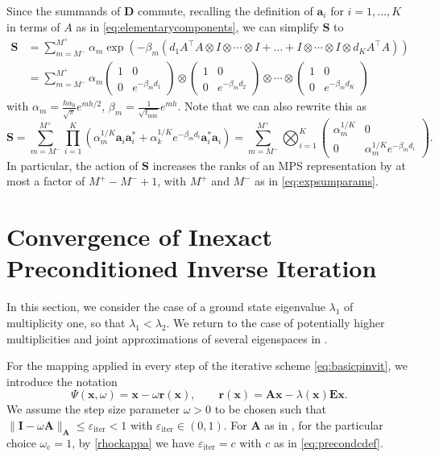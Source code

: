 \documentclass[a4paper,11pt,oneside]{amsart}
\theoremstyle{definition}
\theoremstyle{remark}
\newcommand{\A}{\ten A}
\newcommand{\E}{\ten E}
\newcommand{\ten}[1]{\boldsymbol{#1}}
\newcommand{\eiter}{\ensuremath{\varepsilon_{\mathrm{iter}}}}
\newcommand{\trp}{\top}
\numberwithin{equation}{section}
\numberwithin{theorem}{section}
\begin{document}
Since the summands of ${\ten D}$ commute, recalling the definition of $\ten a_i$ for $i=1,\ldots,K$ in terms of $A$ as in \eqref{eq:elementarycomponents}, we can simplify $\ten S$ to
\begin{align*}
\ten S & =
 \sum_{m = M^-}^{M^+} \alpha_m \exp(-\beta_m (d_{1} A^\trp A \otimes I \otimes \cdots \otimes  I + \ldots +  I \otimes \cdots \otimes  I \otimes d_K A^\trp A))   \\
& =  \sum_{m = M^-}^{M^+} \alpha_m  \begin{pmatrix}
1 & 0 \\ 0 & e^{-\beta_m   d_1}
\end{pmatrix}  \otimes \begin{pmatrix}
1 & 0 \\ 0 & e^{-\beta_m   d_2}
\end{pmatrix}  \otimes \cdots \otimes  \begin{pmatrix}
1 & 0 \\ 0 & e^{-\beta_m   d_K}
\end{pmatrix} 
\end{align*}
with $\alpha_m = \frac{h \alpha_0}{\sqrt{ \pi}} e^{m h / 2}$, $\beta_m = \frac{1}{\sqrt{t_{\min}}} e^{m h}$.
Note that we can also rewrite this as
\[ 
    \ten S = \sum_{m = M^-}^{M^+} \prod_{i = 1 }^K ( \alpha_m^{1/K } \ten a_i \ten a_i^\ast + \alpha_k^{1/K} e^{-\beta_m d_i} \ten a_i^\ast \ten a_i ) = \sum_{m = M^-}^{M^+} 
\bigotimes_{i = 1}^K \begin{pmatrix} \alpha_m^{1/K} & 0 \\ 0 & \alpha_m^{1/K} e^{-\beta_m d_i} \end{pmatrix}. 
\]
In particular, the action of $\ten S$ increases the ranks of an MPS representation by at most a factor of $M^+ - M^- + 1$, with $M^+$ and $M^-$ as in \eqref{eq:expsumparams}.


\section{Convergence of Inexact Preconditioned Inverse Iteration}\label{sec:conv}

In this section, we consider the case of a ground state eigenvalue $\lambda_1$ of multiplicity one, so that $\lambda_1 < \lambda_2$. We return to the case of potentially higher multiplicities and joint approximations of several eigenspaces in .

For the mapping applied in every step of the iterative scheme \eqref{eq:basicpinvit}, we introduce the notation
\begin{equation}\label{eq:unpertiter}
   \Psi (\ten x, \omega) = \ten x - \omega \ten r(\ten x), \qquad \ten r(\ten x) = \A \ten x - \lambda(\ten x) \E \ten x.	
\end{equation}
We assume the step size parameter $\omega>0$ to be chosen such that $ \| \ten I - \omega  \A \|_{\A}  \leq \eiter < 1$ with $\eiter \in (0,1)$.
For $\ten A$ as in , for the particular choice $\omega_{\mathrm c} = 1$, by \eqref{rhockappa} we have $\eiter = c$ with $c$ as in \eqref{eq:precondcdef}.
\end{document}
